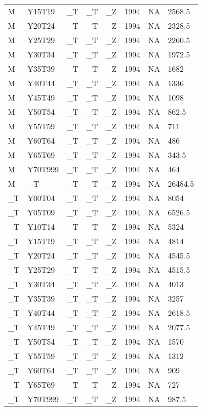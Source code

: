 \begin{longtable}[t]{llllllll}
\addlinespace
M & Y15T19 & \_T & \_T & \_Z & 1994 & NA & 2568.5\\
M & Y20T24 & \_T & \_T & \_Z & 1994 & NA & 2328.5\\
M & Y25T29 & \_T & \_T & \_Z & 1994 & NA & 2260.5\\
M & Y30T34 & \_T & \_T & \_Z & 1994 & NA & 1972.5\\
M & Y35T39 & \_T & \_T & \_Z & 1994 & NA & 1682\\
\addlinespace
M & Y40T44 & \_T & \_T & \_Z & 1994 & NA & 1336\\
M & Y45T49 & \_T & \_T & \_Z & 1994 & NA & 1098\\
M & Y50T54 & \_T & \_T & \_Z & 1994 & NA & 862.5\\
M & Y55T59 & \_T & \_T & \_Z & 1994 & NA & 711\\
M & Y60T64 & \_T & \_T & \_Z & 1994 & NA & 486\\
\addlinespace
M & Y65T69 & \_T & \_T & \_Z & 1994 & NA & 343.5\\
M & Y70T999 & \_T & \_T & \_Z & 1994 & NA & 464\\
M & \_T & \_T & \_T & \_Z & 1994 & NA & 26484.5\\
\_T & Y00T04 & \_T & \_T & \_Z & 1994 & NA & 8054\\
\_T & Y05T09 & \_T & \_T & \_Z & 1994 & NA & 6526.5\\
\addlinespace
\_T & Y10T14 & \_T & \_T & \_Z & 1994 & NA & 5324\\
\_T & Y15T19 & \_T & \_T & \_Z & 1994 & NA & 4814\\
\_T & Y20T24 & \_T & \_T & \_Z & 1994 & NA & 4545.5\\
\_T & Y25T29 & \_T & \_T & \_Z & 1994 & NA & 4515.5\\
\_T & Y30T34 & \_T & \_T & \_Z & 1994 & NA & 4013\\
\addlinespace
\_T & Y35T39 & \_T & \_T & \_Z & 1994 & NA & 3257\\
\_T & Y40T44 & \_T & \_T & \_Z & 1994 & NA & 2618.5\\
\_T & Y45T49 & \_T & \_T & \_Z & 1994 & NA & 2077.5\\
\_T & Y50T54 & \_T & \_T & \_Z & 1994 & NA & 1570\\
\_T & Y55T59 & \_T & \_T & \_Z & 1994 & NA & 1312\\
\addlinespace
\_T & Y60T64 & \_T & \_T & \_Z & 1994 & NA & 909\\
\_T & Y65T69 & \_T & \_T & \_Z & 1994 & NA & 727\\
\_T & Y70T999 & \_T & \_T & \_Z & 1994 & NA & 987.5\\

\end{longtable}
